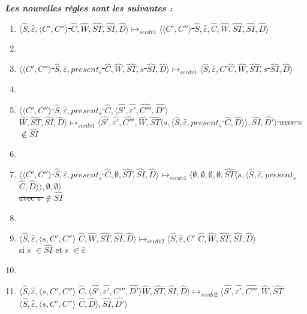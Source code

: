 \documentclass[10pt,a4paper]{article}
\begin{document}
				\textbf{\textit{Les nouvelles règles sont les suivantes :}}
				\smallbreak
				\begin{enumerate}
					\item \sout{$\langle\widehat{S},\widehat{\varepsilon},\langle C',C''\rangle$ $\widehat{C},\widehat{W},\widehat{ST},\widehat{SI},\widehat{D}\rangle \longmapsto_{secdv1} \langle\langle C',C''\rangle$ $\widehat{S},\widehat{\varepsilon},\widehat{C},\widehat{W},\widehat{ST},\widehat{SI},\widehat{D}\rangle$}
					\item[]
					\item \sout{$\langle\langle C',C''\rangle $ $\widehat{S},\widehat{\varepsilon},present_{s}$ $\widehat{C},\widehat{W},\widehat{ST},s$ $\widehat{SI},\widehat{D}\rangle \longmapsto_{secdv1} \langle\widehat{S},\widehat{\varepsilon},C'\widehat{C},\widehat{W},\widehat{ST},s$ $\widehat{SI},\widehat{D}\rangle$}
					\item[]
					\item \sout{$\langle\langle C',C''\rangle $ $\widehat{S},\widehat{\varepsilon},present_{s}$ $\widehat{C},\langle\widehat{S'},\widehat{\varepsilon'},\widehat{C'''},\widehat{D'}\rangle$ $\widehat{W},\widehat{ST},\widehat{SI},\widehat{D}\rangle \longmapsto_{secdv1} \langle\widehat{S'},\widehat{\varepsilon'},\widehat{C'''},\widehat{W},\widehat{ST}\langle s,\langle\widehat{S},\widehat{\varepsilon},present_{s}$ $\widehat{C},\widehat{D}\rangle\rangle,\widehat{SI},\widehat{D'}\rangle$ avec s $\notin \widehat{SI}$ }
					\item[]
					\item \sout{$\langle\langle C',C''\rangle $ $\widehat{S},\widehat{\varepsilon},present_{s}$ $\widehat{C},\emptyset,\widehat{ST},\widehat{SI},\widehat{D}\rangle \longmapsto_{secdv1} \langle\emptyset,\emptyset,\emptyset,\emptyset,\widehat{ST}\langle s,\langle\widehat{S},\widehat{\varepsilon},present_{s}$ $\widehat{C},\widehat{D}\rangle\rangle,\emptyset,\emptyset\rangle$ 
					\\avec s $\notin \widehat{SI}$}
					\item[]
					\item $\langle\widehat{S},\widehat{\varepsilon},\langle s, C',C''\rangle$ $\widehat{C},\widehat{W},\widehat{ST},\widehat{SI},\widehat{D}\rangle \longmapsto_{secdv2} \langle\widehat{S},\widehat{\varepsilon},C'$ $\widehat{C},\widehat{W},\widehat{ST},\widehat{SI},\widehat{D}\rangle$ 
					\\si s $\in \widehat{SI}$ et s $\in \widehat{\varepsilon}$ 
					\item[]
					\item $\langle\widehat{S},\widehat{\varepsilon},\langle s, C',C''\rangle$ $\widehat{C},\langle\widehat{S'},\widehat{\varepsilon'},C''',\widehat{D'}\rangle\widehat{W},\widehat{ST},\widehat{SI},\widehat{D}\rangle \longmapsto_{secdv2} \langle\widehat{S'},\widehat{\varepsilon'},\widehat{C'''},\widehat{W},\widehat{ST}$ $\langle\widehat{S},\widehat{\varepsilon},\langle s, C',C''\rangle$ $\widehat{C},\widehat{D}\rangle,\widehat{SI},\widehat{D'}\rangle$ 

\end{enumerate}
\end{document}

